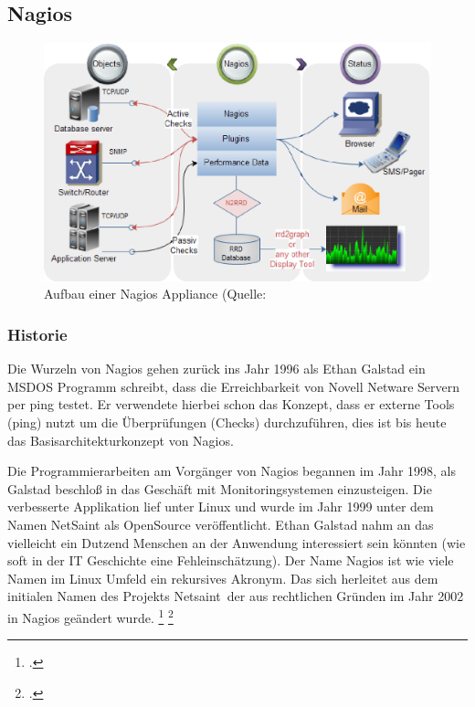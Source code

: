 \documentclass[12pt,a4paper,parskip,listof=totoc,bibliography=totoc]{scrreprt}
\begin{document}
	\subsection{Nagios}
	\begin{figure}[!h]
	\centering
	\includegraphics[width=1\textwidth]{pics/NagiosMonitoring.eps}
    \caption[Grober Aufbau von Nagios]{Aufbau einer Nagios Appliance (Quelle: \textcite{nagiosaufbau}}
    \label{fig:nagiosaufbau}
	\end{figure}
	\clearpage
	\subsubsection{Historie}
	Die Wurzeln von Nagios gehen zurück ins Jahr 1996 als Ethan Galstad ein MSDOS Programm schreibt, dass die Erreichbarkeit von Novell Netware Servern per ping testet. Er verwendete hierbei schon das Konzept, dass er externe Tools (ping) nutzt um die Überprüfungen (\glqq Checks\grqq) durchzuführen, dies ist bis heute das Basisarchitekturkonzept von Nagios.
	
	Die Programmierarbeiten am Vorgänger von Nagios begannen im Jahr 1998, als Galstad beschloß in das Geschäft mit Monitoringsystemen einzusteigen. Die verbesserte Applikation lief unter Linux und wurde im Jahr 1999 unter dem Namen NetSaint als OpenSource veröffentlicht. Ethan Galstad nahm an das vielleicht ein Dutzend Menschen an der Anwendung interessiert sein könnten (wie soft in der IT Geschichte eine Fehleinschätzung).
	Der Name Nagios ist wie viele Namen im Linux Umfeld ein rekursives Akronym. Das sich herleitet aus dem initialen Namen des Projekts \glqq Netsaint\grqq\ der aus rechtlichen Gründen im Jahr 2002 in Nagios geändert wurde. 
	\footcite{nagioshistory} \footcite{nagiosnamefaq}
	
\end{document}

